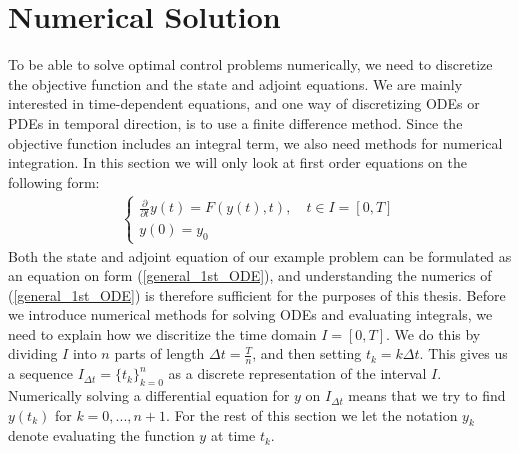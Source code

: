 \section{Numerical Solution}
To be able to solve optimal control problems numerically, we need to discretize the objective function and the state and adjoint equations. We are mainly interested in time-dependent equations, and one way of discretizing ODEs or PDEs in temporal direction, is to use a finite difference method. Since the objective function includes an integral term, we also need methods for numerical integration. In this section we will only look at first order equations on the following form:
\begin{align}
\left\{
     \begin{array}{lr}
	\frac{\partial}{\partial t} y(t) = F(y(t),t),\quad t\in I=[0,T] \\
	y(0)=y_0 
	\end{array}
\right.\label{general_1st_ODE}
\end{align}
Both the state and adjoint equation of our example problem can be formulated as an equation on form (\ref{general_1st_ODE}), and understanding the numerics of (\ref{general_1st_ODE}) is therefore sufficient for the purposes of this thesis. Before we introduce numerical methods for solving ODEs and evaluating integrals, we need to explain how we discritize the time domain $I=[0,T]$. We do this by dividing $I$ into $n$ parts of length $\Delta t=\frac{T}{n}$, and then setting $t_k=k\Delta t$. This gives us a sequence $I_{\Delta t}=\{t_k\}_{k=0}^{n}$ as a discrete representation of the interval $I$. Numerically solving a differential equation for $y$ on $I_{\Delta t}$ means that we try to find $y(t_k)$ for $k=0,...,n+1$. For the rest of this section we let the notation $y_k$ denote evaluating the function $y$ at time $t_k$.
